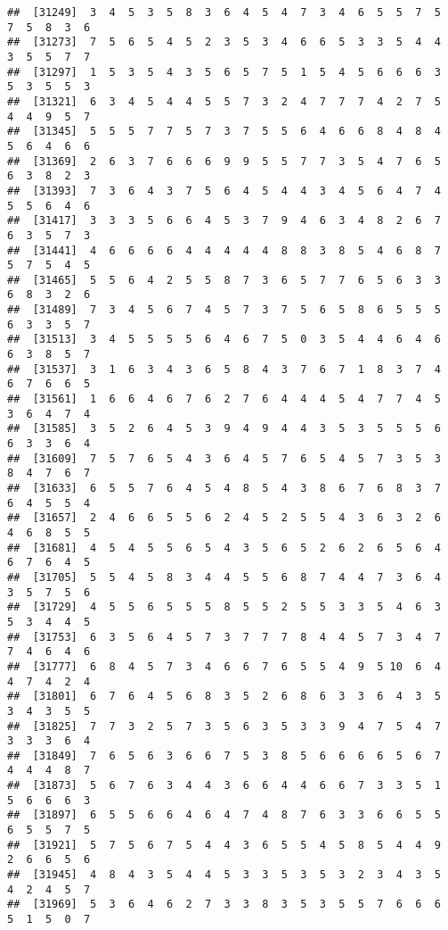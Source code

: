 \documentclass[
]{book}
\begin{document}
\begin{verbatim}
##  [31249]  3  4  5  3  5  8  3  6  4  5  4  7  3  4  6  5  5  7  5  7  5  8  3  6
##  [31273]  7  5  6  5  4  5  2  3  5  3  4  6  6  5  3  3  5  4  4  3  5  5  7  7
##  [31297]  1  5  3  5  4  3  5  6  5  7  5  1  5  4  5  6  6  6  3  5  3  5  5  3
##  [31321]  6  3  4  5  4  4  5  5  7  3  2  4  7  7  7  4  2  7  5  4  4  9  5  7
##  [31345]  5  5  5  7  7  5  7  3  7  5  5  6  4  6  6  8  4  8  4  5  6  4  6  6
##  [31369]  2  6  3  7  6  6  6  9  9  5  5  7  7  3  5  4  7  6  5  6  3  8  2  3
##  [31393]  7  3  6  4  3  7  5  6  4  5  4  4  3  4  5  6  4  7  4  5  5  6  4  6
##  [31417]  3  3  3  5  6  6  4  5  3  7  9  4  6  3  4  8  2  6  7  6  3  5  7  3
##  [31441]  4  6  6  6  6  4  4  4  4  4  8  8  3  8  5  4  6  8  7  5  7  5  4  5
##  [31465]  5  5  6  4  2  5  5  8  7  3  6  5  7  7  6  5  6  3  3  6  8  3  2  6
##  [31489]  7  3  4  5  6  7  4  5  7  3  7  5  6  5  8  6  5  5  5  6  3  3  5  7
##  [31513]  3  4  5  5  5  5  6  4  6  7  5  0  3  5  4  4  6  4  6  6  3  8  5  7
##  [31537]  3  1  6  3  4  3  6  5  8  4  3  7  6  7  1  8  3  7  4  6  7  6  6  5
##  [31561]  1  6  6  4  6  7  6  2  7  6  4  4  4  5  4  7  7  4  5  3  6  4  7  4
##  [31585]  3  5  2  6  4  5  3  9  4  9  4  4  3  5  3  5  5  5  6  6  3  3  6  4
##  [31609]  7  5  7  6  5  4  3  6  4  5  7  6  5  4  5  7  3  5  3  8  4  7  6  7
##  [31633]  6  5  5  7  6  4  5  4  8  5  4  3  8  6  7  6  8  3  7  6  4  5  5  4
##  [31657]  2  4  6  6  5  5  6  2  4  5  2  5  5  4  3  6  3  2  6  4  6  8  5  5
##  [31681]  4  5  4  5  5  6  5  4  3  5  6  5  2  6  2  6  5  6  4  6  7  6  4  5
##  [31705]  5  5  4  5  8  3  4  4  5  5  6  8  7  4  4  7  3  6  4  3  5  7  5  6
##  [31729]  4  5  5  6  5  5  5  8  5  5  2  5  5  3  3  5  4  6  3  5  3  4  4  5
##  [31753]  6  3  5  6  4  5  7  3  7  7  7  8  4  4  5  7  3  4  7  7  4  6  4  6
##  [31777]  6  8  4  5  7  3  4  6  6  7  6  5  5  4  9  5 10  6  4  4  7  4  2  4
##  [31801]  6  7  6  4  5  6  8  3  5  2  6  8  6  3  3  6  4  3  5  3  4  3  5  5
##  [31825]  7  7  3  2  5  7  3  5  6  3  5  3  3  9  4  7  5  4  7  3  3  3  6  4
##  [31849]  7  6  5  6  3  6  6  7  5  3  8  5  6  6  6  6  5  6  7  4  4  4  8  7
##  [31873]  5  6  7  6  3  4  4  3  6  6  4  4  6  6  7  3  3  5  1  5  6  6  6  3
##  [31897]  6  5  5  6  6  4  6  4  7  4  8  7  6  3  3  6  6  5  5  6  5  5  7  5
##  [31921]  5  7  5  6  7  5  4  4  3  6  5  5  4  5  8  5  4  4  9  2  6  6  5  6
##  [31945]  4  8  4  3  5  4  4  5  3  3  5  3  5  3  2  3  4  3  5  4  2  4  5  7
##  [31969]  5  3  6  4  6  2  7  3  3  8  3  5  3  5  5  7  6  6  6  5  1  5  0  7

\end{verbatim}
\end{document}
